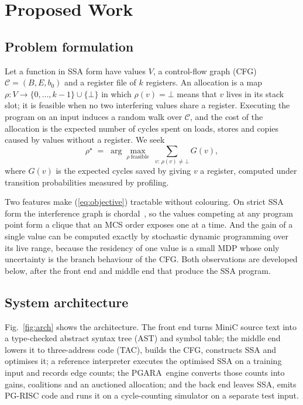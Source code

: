 \documentclass{ieeeaccess}
\newcommand{\MG}{PGARA}
\begin{document}
\section{Proposed Work}
\label{sec:proposed}

\subsection{Problem formulation}

Let a function in SSA form have values $V$, a control-flow graph (CFG)
$\mathcal{C}=(B,E,b_0)$ and a register file of $k$ registers. An
allocation is a map $\rho: V \to \{0,\dots,k{-}1\}\cup\{\bot\}$ in which
$\rho(v)=\bot$ means that $v$ lives in its stack slot; it is feasible
when no two interfering values share a register. Executing the program
on an input induces a random walk over $\mathcal{C}$, and the cost of
the allocation is the expected number of cycles spent on loads, stores
and copies caused by values without a register. We seek
\begin{equation}
\rho^\star \;=\; \arg\max_{\rho\ \text{feasible}}\;
\sum_{v:\,\rho(v)\neq\bot} G(v),
\label{eq:objective}
\end{equation}
where $G(v)$ is the expected cycles saved by giving $v$ a register,
computed under transition probabilities measured by profiling.

Two features make (\ref{eq:objective}) tractable without colouring.
On strict SSA form the interference graph is chordal~\cite{hack2006ssa},
so the values competing at any program point form a clique that an MCS
order exposes one at a time. And the gain of a single value can be
computed exactly by stochastic dynamic programming over its live range,
because the residency of one value is a small MDP whose only uncertainty
is the branch behaviour of the CFG. Both observations are developed
below, after the front end and middle end that produce the SSA program.

\subsection{System architecture}

Fig.~\ref{fig:arch} shows the architecture. The front end turns MiniC
source text into a type-checked abstract syntax tree (AST) and symbol
table; the middle end lowers it to three-address code (TAC), builds the
CFG, constructs SSA and optimises it; a reference interpreter executes
the optimised SSA on a training input and records edge counts; the
\MG\ engine converts those counts into gains, coalitions and an
auctioned allocation; and the back end leaves SSA, emits PG-RISC code
and runs it on a cycle-counting simulator on a separate test input.
\end{document}
